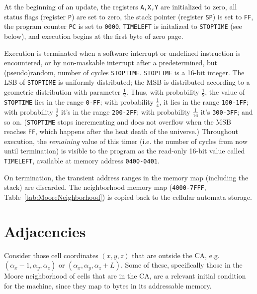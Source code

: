 \documentclass{article}
\newcommand\hex[1]{{\tt #1}}
\newcommand\hexrange[2]{\hex{#1}{\tt -}\hex{#2}}
\begin{document}
At the beginning of an update,
the registers {\tt A,X,Y} are initialized to zero,
all status flags (register {\tt P}) are set to zero,
the stack pointer (register {\tt SP}) is set to \hex{FF},
the program counter {\tt PC} is set to \hex{0000},
{\tt TIMELEFT} is initalized to {\tt STOPTIME} (see below),
and execution begins at the first byte of zero page.

Execution is terminated
when a software interrupt or undefined instruction is encountered,
or by non-maskable interrupt after a predetermined, but (pseudo)random, number of cycles {\tt STOPTIME}.
{\tt STOPTIME} is a 16-bit integer.
The LSB of {\tt STOPTIME} is uniformly distributed;
the MSB is distributed according to a geometric distribution with parameter $\frac{1}{2}$.
Thus, with probability $\frac{1}{2}$, the value of {\tt STOPTIME} lies in the range \hexrange{0}{FF};
with probability $\frac{1}{4}$, it lies in the range \hexrange{100}{1FF};
with probability $\frac{1}{8}$ it's in the range \hexrange{200}{2FF};
with probability $\frac{1}{16}$ it's \hexrange{300}{3FF};
and so on.
({\tt STOPTIME} stops incrementing and does not overflow when the MSB reaches \hex{FF},
which happens after the heat death of the universe.)
Throughout execution, the {\em remaining} value of this timer
(i.e. the number of cycles from now until termination)
is visible to the program
as the read-only 16-bit value called {\tt TIMELEFT},
available at memory address \hexrange{0400}{0401}.

On termination, the transient address ranges in the memory map
(including the stack)
are discarded.
The neighborhood memory map (\hexrange{4000}{7FFF}, Table~\ref{tab:MooreNeighborhood})
is copied back to the cellular automata storage.

\section{Adjacencies}

Consider those cell coordinates $(x,y,z)$ that are outside the CA,
e.g. $(\alpha_x-1,\alpha_y,\alpha_z)$ or  $(\alpha_x,\alpha_y,\alpha_z + L)$.
Some of these, specifically those in the Moore neighborhood of cells that are in the CA,
are a relevant initial condition for the machine,
since they map to bytes in its addressable memory.
\end{document}
